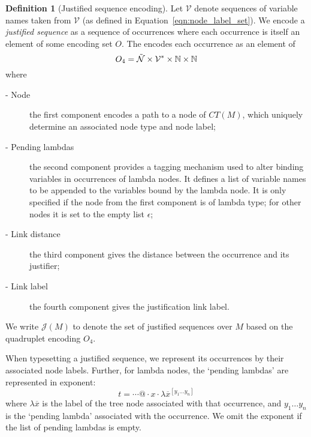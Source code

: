 \documentclass{article}
\theoremstyle{plain}
\theoremstyle{definition}
\newtheorem{definition}{Definition}[section]
\theoremstyle{remark}
\newcommand\Nodes{\mathcal{N}}%
\newcommand\ExtendedNodes{\tilde{\Nodes}}
\newcommand{\ctree}{CT} %
\def\justseqset{\mathcal{J}}
\begin{document}
\begin{definition}[Justified sequence encoding]
    Let $\mathcal{V}$ denote sequences of variable names taken from $\mathcal{V}$ (as defined in Equation~\ref{eqn:node_label_set}).
    We encode a \emph{justified sequence} as a sequence of occurrences where each occurrence is itself an element of some encoding set $O$.
    The  encodes each occurrence as an element of
$$O_4 =  \ExtendedNodes\times \mathcal{V}^* \times\nat\times\nat$$
where
\begin{description}
    \item [- Node] the first component encodes a path to a node of $\ctree(M)$, which uniquely determine an associated node type and node label;
    \item[- Pending lambdas] the second component provides a tagging mechanism used to alter binding variables in occurrences of lambda nodes. It defines a list of variable names to be appended to the  variables bound by the lambda node. It is only specified if the node from the first component is of lambda type; for other nodes it is set to the empty list $\epsilon$;
    \item[- Link distance] the third component gives the distance between the occurrence and its justifier;
    \item[- Link label] the fourth component gives the justification link label.
\end{description}
\end{definition}

We write $\justseqset(M)$ to denote the set of justified sequences over $M$ based on the quadruplet encoding $O_4$.

When typesetting a justified sequence, we represent its occurrences by their associated node labels. Further, for lambda nodes, the `pending lambdas' are represented in exponent:
$$t = \cdots @ \cdot x \cdot \lambda\overline{x}^{[y_1 \ldots y_n]}$$
where $\lambda\overline{x}$ is the label of the tree node associated with that occurrence, and $y_1 \ldots y_n$ is the `pending lambda' associated with the occurrence. We omit the exponent if the list of pending lambdas is empty.
\end{document}
